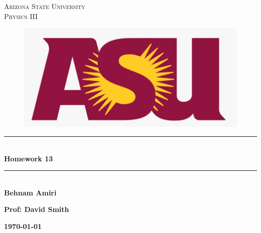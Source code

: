 \documentclass[fleqn]{article}
\begin{document}
  \begin{titlepage}

    \newcommand{\HRule}{\rule{\linewidth}{0.5mm}} %

    \center %



    \textsc{\LARGE Arizona State University}\\[1.5cm] %

    \textsc{\LARGE Physics III }\\[1.5cm] %


    \begin{figure}
      \includegraphics[width=\linewidth]{asu.png}
    \end{figure}


    \HRule \\[0.4cm]
    { \huge \bfseries Homework 13}\\[0.4cm] 
    \HRule \\[1.5cm]

    \textbf{Behnam Amiri}

    \bigbreak

    \textbf{Prof: David Smith}

    \bigbreak


    \textbf{{\large \today}\\[2cm]}

    \vfill %

  \end{titlepage}
\end{document}
